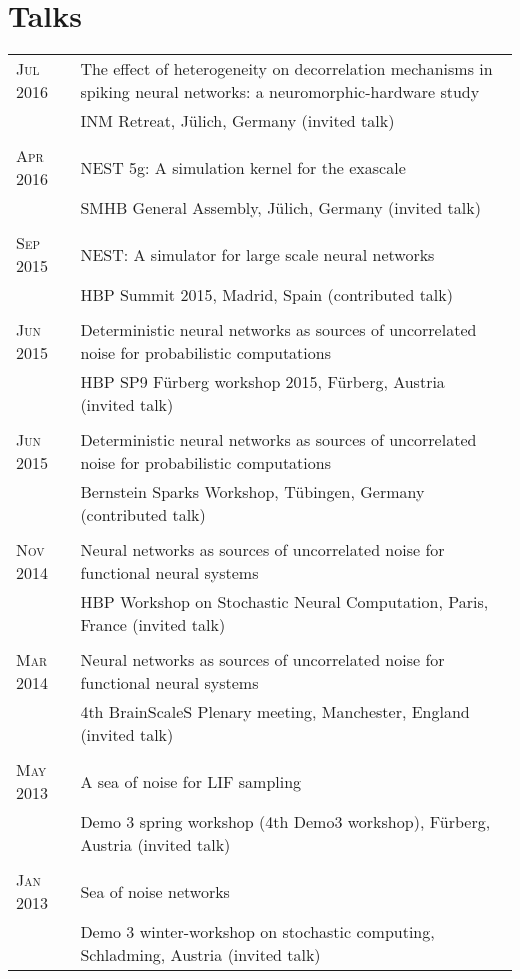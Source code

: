 \documentclass[a4paper,10pt]{article}
\begin{document}
\section{Talks}
\begin{longtable}{>{\hfill}p{1.6cm}|p{}}
  \textsc{Jul} 2016 & The effect of heterogeneity on decorrelation mechanisms in spiking neural networks: a neuromorphic-hardware study \\
  & \footnotesize INM Retreat, J\"ulich, Germany (invited talk)\\
  \multicolumn{2}{c}{} \\
  \textsc{Apr} 2016 & NEST 5g: A simulation kernel for the exascale \\
  & \footnotesize SMHB General Assembly, J\"ulich, Germany (invited talk)\\
  \multicolumn{2}{c}{} \\
  \textsc{Sep} 2015 & NEST: A simulator for large scale neural networks\\
  & \footnotesize HBP Summit 2015, Madrid, Spain (contributed talk)\\
  \multicolumn{2}{c}{} \\
  \textsc{Jun} 2015 & Deterministic neural networks as sources of uncorrelated noise for probabilistic computations\\
  & \footnotesize HBP SP9 F\"urberg workshop 2015, F\"urberg, Austria (invited talk)\\
  \multicolumn{2}{c}{} \\
  \textsc{Jun} 2015 & Deterministic neural networks as sources of uncorrelated noise for probabilistic computations \\
  & \footnotesize Bernstein Sparks Workshop, T\"ubingen, Germany (contributed talk)\\
  \multicolumn{2}{c}{} \\
  \textsc{Nov} 2014 & Neural networks as sources of uncorrelated noise for functional neural systems \\
  & \footnotesize HBP Workshop on Stochastic Neural Computation, Paris, France (invited talk)\\
  \multicolumn{2}{c}{} \\
  \textsc{Mar} 2014 & Neural networks as sources of uncorrelated noise for functional neural systems \\
  & \footnotesize 4th BrainScaleS Plenary meeting, Manchester, England  (invited talk)\\
  \multicolumn{2}{c}{} \\
  \textsc{May} 2013 & A sea of noise for LIF sampling \\
  & \footnotesize Demo 3 spring workshop (4th Demo3 workshop), F\"urberg, Austria  (invited talk)\\
  \multicolumn{2}{c}{} \\
  \textsc{Jan} 2013 & Sea of noise networks \\
  & \footnotesize Demo 3 winter-workshop on stochastic computing, Schladming, Austria (invited talk)\\
\end{longtable}
\end{document}
